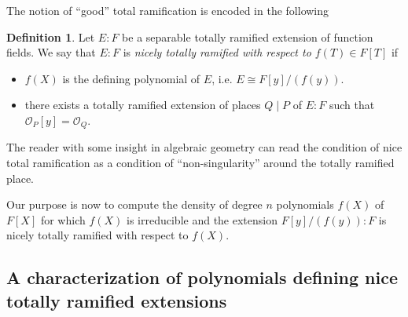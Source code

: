 \documentclass[10pt]{amsart}
\newcommand{\vF}{\mathbb{F}}
\newcommand{\cO}{\mathcal{O}}
\theoremstyle{definition}
\newtheorem{definition}[theorem]{Definition}
\theoremstyle{remark}
\newtheorem{example}[theorem]{Example}
\numberwithin{equation}{section}
\begin{document}
The notion of ``good'' total ramification is encoded in the following
\begin{definition}\label{def:goodtotram}
Let $E:F$ be a separable totally ramified extension of function fields. We say that $E:F$ is \emph{nicely totally ramified with respect to $f(T)\in F[T]$} if 
\begin{itemize}
\item $f(X)$ is the defining polynomial of $E$, i.e. $E\cong F[y]/(f(y))$.
\item there exists a totally ramified extension of places $Q\mid P$ of $E:F$ such that $\cO_P[y]=\cO_Q$.
\end{itemize}
\end{definition}
The reader with some insight in algebraic geometry can read the condition of nice total ramification as a condition of ``non-singularity'' around the totally ramified place. 
%
%

Our purpose is now to compute the density of degree $n$ polynomials $f(X)$ of $F[X]$ for which $f(X)$ is irreducible and the extension $F[y]/(f(y)):F$ is nicely totally ramified with respect to $f(X)$.

\subsection{A characterization of polynomials defining nice totally ramified extensions}
\end{document}
